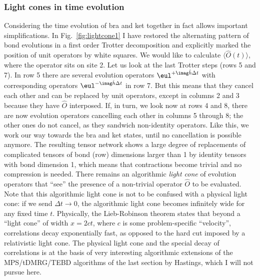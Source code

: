 \subsubsection{Light cones in time evolution}
Considering the time evolution of bra and ket together in fact allows important simplifications. In Fig.~\ref{fig:lightcone1} I have restored the alternating pattern of bond evolutions in a first order Trotter decomposition and explicitly marked the position of unit operators by white squares. We would like to calculate $\langle \hat{O}(t) \rangle$, where the operator sits on site 2. Let us look at the last Trotter steps (rows 5 and 7). In row 5 there are several evolution operators $\eul^{+\imag \hat{h} \Delta t}$ with corresponding operators  $\eul^{-\imag \hat{h} \Delta t}$ in row 7. But this means that they cancel each other and can be replaced by unit operators, except in columns 2 and 3 because they have $\hat{O}$ interposed. If, in turn, we look now at rows 4 and 8, there are now evolution operators cancelling each other in columns 5 through 8; the other ones do not cancel, as they sandwich non-identity operators. Like this, we work our way towards the bra and ket states, until no cancellation is possible anymore. The resulting tensor network shows a large degree of replacements of complicated tensors of bond (row) dimensions larger than 1 by identity tensors with bond dimension 1, which means that contractions become trivial and no compression is needed. There remains an algorithmic {\em light cone} of evolution operators that ``see'' the presence of a non-trivial operator $\hat{O}$ to be evaluated. Note that this algorithmic light cone is not to be confused with a physical light cone: if we send $\Delta t\rightarrow 0$, the algorithmic light cone becomes infinitely wide for any fixed time $t$. Physically, the Lieb-Robinson theorem states that beyond a ``light cone'' of width $x=2ct$, where $c$ is some problem-specific ``velocity'', correlations decay exponentially fast, as opposed to the hard cut imposed by a relativistic light cone. The physical light cone and the special decay of correlations is at the basis of very interesting algorithmic extensions of the MPS/tDMRG/TEBD algorithms of the last section by Hastings\cite{Hastings09,Hastings08}, which I will not pursue here.

